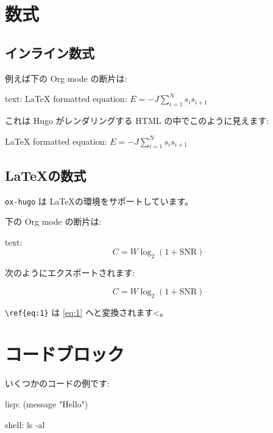 \documentclass[dvipdfmx,a4j,14pt,uplatex,openany]{jsbook}
\begin{document}
\section{数式}
\label{sec:org76ed477}
\subsection{インライン数式}
\label{sec:org51cf58a}
例えば下の Org mode の断片は:

\begin{programlist}[label={nil}]{text}{: }LaTeX formatted equation: \( E = -J \sum_{i=1}^N s_i s_{i+1} \)
\end{programlist}

これは Hugo がレンダリングする HTML の中でこのように見えます:

\LaTeX{} formatted equation: \(E = -J \sum_{i=1}^N s_i s_{i+1 }\)
\subsection{\LaTeX の数式}
\label{sec:org2f4c1d0}
\texttt{ox-hugo} は \LaTeX の環境をサポートしています。

下の Org mode の断片は:

\begin{programlist}[label={latex-example}]{text}{: }\begin{equation}
\label{eq:0}
C = W\log_{2} (1+\mathrm{SNR})
\end{equation}
\end{programlist}

次のようにエクスポートされます:

\begin{equation}
\label{eq:1}
C = W\log_{2} (1+\mathrm{SNR})
\end{equation}

\texttt{\textbackslash{}ref\{eq:1\}} は \ref{eq:1} へと変換されます<。



\section{コードブロック}
\label{sec:orge91f4d9}
いくつかのコードの例です:

\begin{programlist}[label={nil}]{lisp}{: }(message "Hello")
\end{programlist}

\begin{programlist}[label={nil}]{shell}{: }ls -al
\end{programlist}
\end{document}
